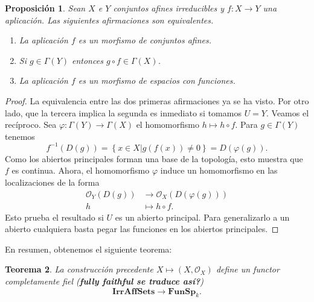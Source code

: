 \documentclass[12pt,a4paper]{article}
\newtheorem{thm}{Teorema}[section]
\newtheorem{prop}[thm]{Proposición}
\theoremstyle{definition} \newtheorem{defn}[thm]{Definición}
\theoremstyle{definition} \newtheorem{ejemplo}[thm]{Ejemplo}
\theoremstyle{definition} \newtheorem{ejercicio}[thm]{Ejercicio}
\theoremstyle{remark} \newtheorem*{obs}{Observación}
\def\OO{\mathscr{O}}
\begin{document}
      \begin{prop}
	Sean $X$ e $Y$ conjuntos afines irreducibles y $f:X\rightarrow Y$ una aplicación. Las siguientes afirmaciones son equivalentes.
	\begin{enumerate}
	  \item La aplicación $f$ es un morfismo de conjuntos afines.
	  \item Si $g\in \Gamma(Y)$ entonces $g\circ f \in \Gamma(X)$.
	  \item La aplicación $f$ es un morfismo de espacios con funciones.
	\end{enumerate}
      \end{prop}

      \begin{proof}
	La equivalencia entre las dos primeras afirmaciones ya se ha visto. Por otro lado, que la tercera implica la segunda es inmediato si tomamos $U=Y$. Veamos el recíproco. Sea $\varphi:\Gamma(Y)\rightarrow \Gamma(X)$ el homomorfismo $h\mapsto h\circ f$. Para $g\in \Gamma(Y)$ tenemos 
	\begin{equation*}
	  f^{-1}(D(g))=\left\{ x\in X | g(f(x))\neq 0 \right\}=D(\varphi(g)).
	\end{equation*}
      Como los abiertos principales forman una base de la topología, esto muestra que $f$ es continua. Ahora, el homomorfismo $\varphi$ induce un homomorfismo en las localizaciones de la forma
      \begin{align*}
	 \OO_Y(D(g))&\longrightarrow \OO_X(D(\varphi(g)))\\ 
	  h &\longmapsto h\circ f. 
	\end{align*}
	Esto prueba el resultado si $U$ es un abierto principal. Para generalizarlo a un abierto cualquiera basta pegar las funciones en los abiertos principales.
      \end{proof}
      En resumen, obtenemos el siguiente teorema:
      \begin{thm}
	La construcción precedente $X\mapsto (X,\OO_X)$ define un functor completamente fiel (\textbf{fully faithful se traduce así?})
	\begin{equation*}
	  \mathbf{IrrAffSets} \longrightarrow \mathbf{FunSp}_k.
	\end{equation*}
      \end{thm}
\end{document}
